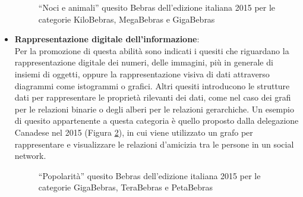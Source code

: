 \documentclass[12pt]{report}
\begin{document}
\begin{itemize}
	\begin{figure}[h]
		\centering
		\caption{``Noci e animali'' quesito Bebras dell'edizione italiana 2015 per le categorie KiloBebras, MegaBebras e GigaBebras}\label{2015-CZ-01}
	\end{figure}

\bigskip
	\item \textbf{Rappresentazione digitale dell'informazione}: 
	\\
	Per la promozione di questa abilità sono indicati i quesiti che riguardano la rappresentazione digitale dei numeri, delle immagini, più in generale di insiemi di oggetti, oppure la rappresentazione visiva di dati attraverso diagrammi come istogrammi o grafici.
	Altri quesiti introducono le strutture dati per rappresentare le proprietà rilevanti dei dati, come nel caso dei grafi per le relazioni binarie o degli alberi per le relazioni gerarchiche. Un esempio di quesito appartenente a questa categoria è quello proposto dalla delegazione Canadese nel 2015 (Figura \ref{2015-CA-01}), in cui viene utilizzato un grafo per rappresentare e visualizzare le relazioni d'amicizia tra le persone in un social network.
	
	\begin{figure}[h]
	\centering
	\caption{``Popolarità'' quesito Bebras dell'edizione italiana 2015 per le categorie GigaBebras, TeraBebras e PetaBebras}\label{2015-CA-01}
	\end{figure}
	

\end{itemize}
\end{document}
